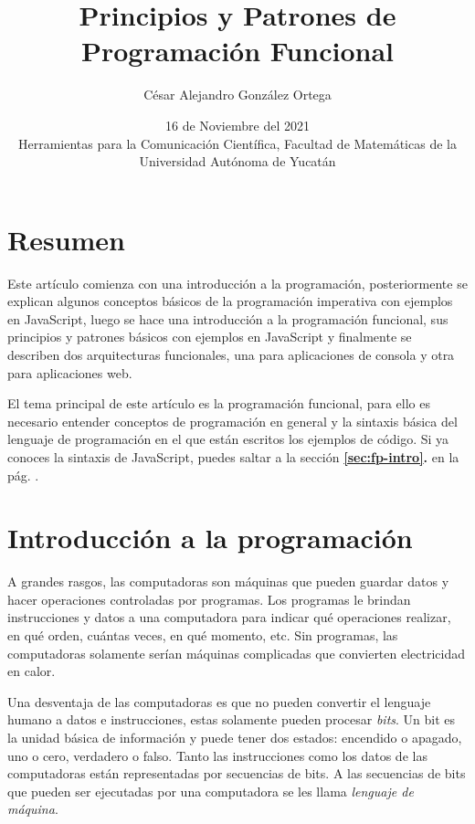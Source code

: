 \documentclass{article}
\begin{document}
\title{\Large{\textbf{Principios y Patrones de Programación Funcional}}}
\author{César Alejandro González Ortega}
\date{16 de Noviembre del 2021 \\
  \bigskip\normalsize{Herramientas para la Comunicación Científica, Facultad de Matemáticas de la Universidad Autónoma de Yucatán}}
\maketitle


\pagebreak
\section*{Resumen}
Este artículo comienza con una introducción a la programación, posteriormente se explican algunos conceptos básicos de la programación imperativa con ejemplos en JavaScript, luego se hace una introducción a la programación funcional, sus principios y patrones básicos con ejemplos en JavaScript y finalmente se describen dos arquitecturas funcionales, una para aplicaciones de consola y otra para aplicaciones web.

El tema principal de este artículo es la programación funcional, para ello es necesario entender conceptos de programación en general y la sintaxis básica del lenguaje de programación en el que están escritos los ejemplos de código. Si ya conoces la sintaxis de JavaScript, puedes saltar a la sección \textbf{\ref{sec:fp-intro}. } en la pág. \pageref{sec:fp-intro}.

\section{Introducción a la programación}
A grandes rasgos, las computadoras son máquinas que pueden guardar datos y hacer operaciones controladas por programas. Los programas le brindan instrucciones y datos a una computadora para indicar qué operaciones realizar, en qué orden, cuántas veces, en qué momento, etc. Sin programas, las computadoras solamente serían máquinas complicadas que convierten electricidad en calor.

Una desventaja de las computadoras es que no pueden convertir el lenguaje humano a datos e instrucciones, estas solamente pueden procesar \textit{bits}. Un bit es la unidad básica de información y puede tener dos estados: encendido o apagado, uno o cero, verdadero o falso. Tanto las instrucciones como los datos de las computadoras están representadas por secuencias de bits. A las secuencias de bits que pueden ser ejecutadas por una computadora se les llama \textit{lenguaje de máquina}.
\end{document}
